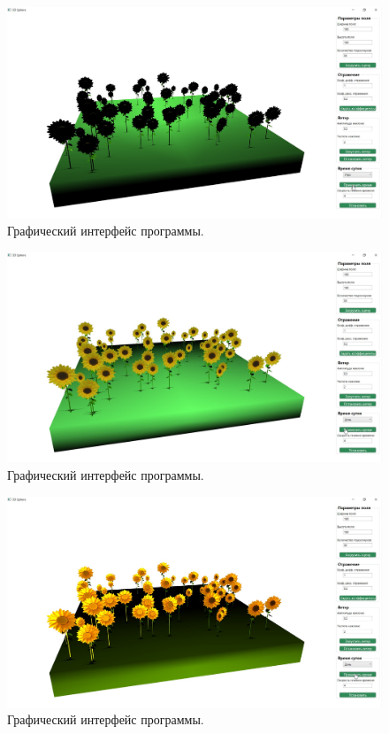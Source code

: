 \begin{figure}[H]
    \centering
    \includegraphics[width=150mm]{images/morning_50}
    \caption{Графический интерфейс программы.}
    \label{images:Morning}
\end{figure}

\begin{figure}[H]
    \centering
    \includegraphics[width=150mm]{images/day_50}
    \caption{Графический интерфейс программы.}
    \label{images:Day}
\end{figure}

\begin{figure}[H]
    \centering
    \includegraphics[width=150mm]{images/evening_50}
    \caption{Графический интерфейс программы.}
    \label{images:Evening}
\end{figure}

